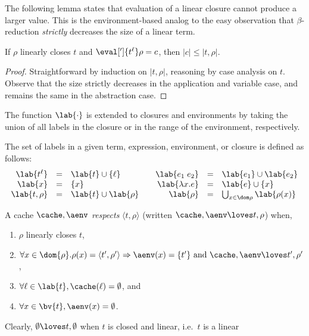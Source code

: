 The following lemma states that evaluation of a linear closure cannot
produce a larger value.  This is the environment-based analog to the
easy observation that $\beta$-reduction {\em strictly} decreases the
size of a linear term.
\begin{lemma}\label{lem:smaller}
If $\rho$ linearly closes $t$ and $\eval[']{t^\ell}\rho = c$, then
$|c|\leq|t,\rho|$.
\end{lemma}
\begin{proof}
Straightforward by induction on $|t,\rho|$, reasoning by case analysis
on $t$.  Observe that the size strictly decreases in the application
and variable case, and remains the same in the abstraction case.
\end{proof}

The function $\lab{\cdot}$ is extended to closures and environments by
taking the union of all labels in the closure or in the range of the
environment, respectively.

\begin{definition}
The set of labels in a given term, expression, environment, or closure
is defined as follows:
\begin{displaymath}
\begin{array}{rcl@{\qquad}rcl}
  \lab{t^\ell}      &=& \lab{t}\cup\{\ell\}      & 
  \lab{e_1\;e_2}    &=& \lab{e_1} \cup \lab{e_2} \\
  \lab{x}           &=& \{x\}                    & 
  \lab{\lambda x.e} &=& \lab{e}\cup\{x\}         \\
  \lab{t,\rho}      &=& \lab{t}\cup\lab{\rho}   & 
  \lab{\rho}        &=& \bigcup_{x\in\dom\rho} \lab{\rho(x)}
\end{array}
\end{displaymath}
\end{definition}

\begin{definition}
  A cache $\cache,\aenv$ {\em respects} $\langle t,\rho\rangle$
  (written $\cache,\aenv\loves t,\rho$) when,
\begin{enumerate}
\item $\rho$ linearly closes $t$,
\item $\forall x \in \dom{\rho} . \rho(x) = \langle t',\rho'\rangle
\Rightarrow \aenv(x) = \{t'\} \mbox { and } \cache,\aenv\loves t',\rho'$,
\item $\forall \ell \in \lab{t}, \cache(\ell) = \emptyset$, and
\item $\forall x \in \bv{t}, \aenv(x) = \emptyset$.
\end{enumerate}
\end{definition}
Clearly, $\emptyset\loves t,\emptyset$ when $t$ is closed and linear,
i.e.~$t$ is a linear 

